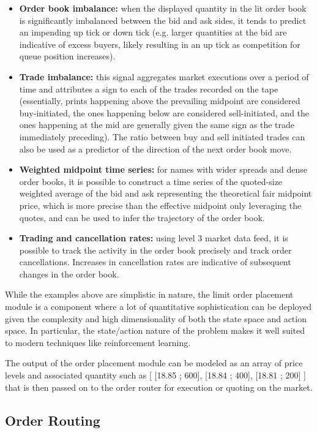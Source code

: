 \begin{itemize}

\item \textbf{Order book imbalance:} when the displayed quantity in the lit order book is significantly imbalanced between the bid and ask sides, it tends to predict an impending up tick or down tick (e.g. larger quantities at the bid are indicative of excess buyers, likely resulting in an up tick as competition for queue position increases).
\item \textbf{Trade imbalance:} this signal aggregates market executions over a period of time and attributes a sign to each of the trades recorded on the tape (essentially, prints happening above the prevailing midpoint are considered buy-initiated, the ones happening below are considered sell-initiated, and the ones happening at the mid are generally given the same sign as the trade immediately preceding). The ratio between buy and sell initiated trades can also be used as a predictor of the direction of the next order book move.
\item \textbf{Weighted midpoint time series:} for names with wider spreads and dense order books, it is possible to construct a time series of the quoted-size weighted average of the bid and ask representing the theoretical fair midpoint price, which is more precise than the effective midpoint only leveraging the quotes, and can be used to infer the trajectory of the order book.
\item \textbf{Trading and cancellation rates:} using level 3 market data feed, it is possible to track the activity in the order book precisely and track order cancellations. Increases in cancellation rates are indicative of subsequent changes in the order book. 
\end{itemize}

While the examples above are simplistic in nature, the limit order placement module is a component where a lot of quantitative sophistication can be deployed given the complexity and high dimensionality of both the state space and action space. In particular, the state/action nature of the problem makes it well suited to modern techniques like reinforcement learning. 

The output of the order placement module can be modeled as an array of price levels and associated quantity such as [ [18.85 ; 600], [18.84 ; 400], [18.81 ; 200] ] that is then passed on to the order router for execution or quoting on the market.

\subsection{Order Routing}


